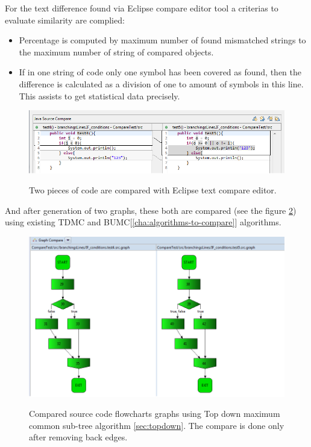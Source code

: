 \documentclass{report}
\begin{document}
For the text difference found via Eclipse compare editor tool a criterias to evaluate similarity are complied:
\begin{itemize}
	\item Percentage is computed by maximum number of found mismatched strings to the maximum number of string of compared objects.
	\item If in one string of code only one symbol has been covered as found, then the difference is calculated as a division of one to amount of symbols in this line. This assists to get statistical data precisely.
\end{itemize}

\begin{figure}[h]
  \centering
  \includegraphics[scale = 0.5]{Figures/Java-flowchart-exp/example-graph.png}\\[0.1cm]
  \caption[Two pieces of code are compared with Eclipse text compare editor]{Two pieces of code are compared with Eclipse text compare editor.}
  \label{fig:example-graph}
\end{figure}

And after generation of two graphs, these both are compared (see the figure \ref{fig:graphs-compared}) using existing TDMC and BUMC[\ref{cha:algorithms-to-compare}] algorithms.
\begin{figure}
  \centering
  \includegraphics[scale = 0.6]{Figures/Java-flowchart-exp/graphs-compared.png}\\[0.1cm]
  \caption[Compared flowchart graphs using TDMC algorithm ]{Compared source code flowcharts graphs using Top down maximum common sub-tree algorithm \ref{sec:topdown}. The compare is done only after removing back edges.}
  \label{fig:graphs-compared}
\end{figure}
\end{document}
